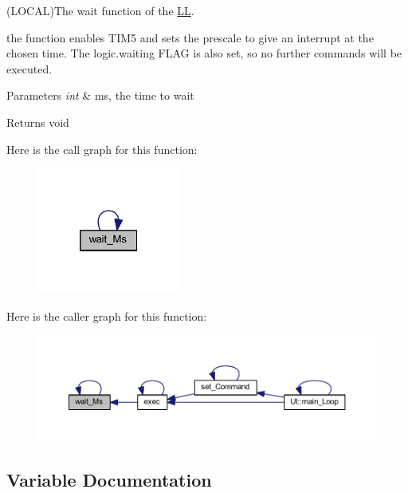 (L\+O\+C\+AL)The wait function of the \mbox{\hyperlink{namespace_l_l}{LL}}. 

the function enables T\+I\+M5 and sets the prescale to give an interrupt at the chosen time. The logic.\+waiting F\+L\+AG is also set, so no further commands will be executed.


\begin{DoxyParams}{Parameters}
{\em int} & ms, the time to wait \\
\hline
\end{DoxyParams}
\begin{DoxyReturn}{Returns}
void 
\end{DoxyReturn}
Here is the call graph for this function\+:\nopagebreak
\begin{figure}[H]
\begin{center}
\leavevmode
\includegraphics[width=133pt]{namespace_l_l_ab30bdedb41438098df71bea7d5eb624d_cgraph}
\end{center}
\end{figure}
Here is the caller graph for this function\+:\nopagebreak
\begin{figure}[H]
\begin{center}
\leavevmode
\includegraphics[width=350pt]{namespace_l_l_ab30bdedb41438098df71bea7d5eb624d_icgraph}
\end{center}
\end{figure}


\subsection{Variable Documentation}
\mbox{\label{namespace_l_l_a4a2f81c33b1d2c746488022b4ebf7a3a}} 
